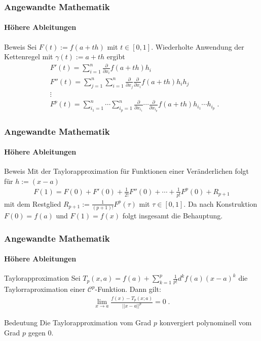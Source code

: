 \documentclass{beamer}
\begin{document}
\begin{frame}
    \frametitle{Angewandte Mathematik}
\framesubtitle{Höhere Ableitungen}
    \begin{block}{Beweis}
Sei $F(t) := f(a + th)$ mit $t \in [0,1]$. Wiederholte Anwendung der Kettenregel mit $\gamma(t) := a +th$ ergibt
\begin{align*}
& F'(t) = \sum_{i=1}^n  \frac{\partial}{\partial x_{i}} f(a + th) h_i \\
& F''(t) =\sum_{j=1}^n \sum_{i=1}^n   \frac{\partial}{\partial x_{j}} \frac{\partial}{\partial x_{i}} f(a + th) h_i h_j \\
& \vdots \\
& F^p(t) =  \sum_{i_1=1}^n  \cdots \sum_{i_p=1}^n   \frac{\partial}{\partial x_{i_1}} \cdots \frac{\partial}{\partial x_{i_p}} f(a + th) h_{i_1} \cdots  h_{i_p}  \; .
\end{align*}
\end{block}
 \end{frame}

\begin{frame}
    \frametitle{Angewandte Mathematik}
\framesubtitle{Höhere Ableitungen}
    \begin{block}{Beweis}
Mit der Taylorapproximation für Funktionen einer Veränderlichen  folgt für $h := (x-a)$ 
\begin{align*}
 F(1) = F(0) + F'(0) + \frac{1}{2!} F''(0) + \cdots + \frac{1}{p!} F^p(0) + R_{p+1} 
\end{align*}
mit dem Restglied $ R_{p+1}  :=  \frac{1}{(p+1)!}  F^p(\tau)$ mit $\tau \in [0,1]$.
Da nach Konstruktion $F(0) = f(a)$ und $F(1)= f(x)$ folgt insgesamt die Behauptung.
\end{block}
 \end{frame}

\begin{frame}
    \frametitle{Angewandte Mathematik}
\framesubtitle{Höhere Ableitungen}
    \begin{block}{Taylorapproximation}
Sei $T_p(x,a) =  f(a) + \sum_{k=1}^{p}\frac{1}{p!} d^k f(a) (x-a)^k$ die Taylorraproximation einer $\mathcal{C}^{p}$-Funktion. Dann gilt: 
\begin{align*}
\lim_{x \to a} \frac{f(x) - T_p(x;a)}{  || x-a  ||^p} = 0 \;. 
\end{align*}
\end{block}

    \begin{block}{Bedeutung}
Die Taylorapproximation vom Grad $p$ konvergiert polynominell vom Grad $p$ gegen $0$.
\end{block}
 \end{frame}
\end{document}
